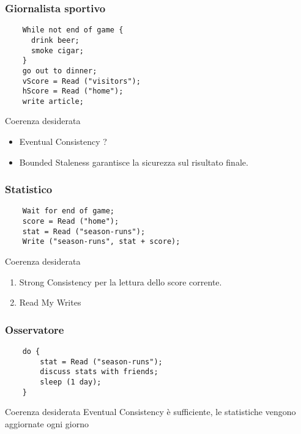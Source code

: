 \begin{frame}[fragile]
 \frametitle{Giornalista sportivo}
  \begin{lstlisting}
    While not end of game {
      drink beer;
      smoke cigar;
    }
    go out to dinner;
    vScore = Read ("visitors");
    hScore = Read ("home");
    write article;
  \end{lstlisting}
  \pause
  \begin{block}{Coerenza desiderata}
   \begin{itemize}
    \item \alert{Eventual Consistency} ?%
    \pause
    \item \alert{Bounded Staleness} garantisce la sicurezza sul risultato finale.
   \end{itemize}  
  \end{block}
\end{frame}

\begin{frame}[fragile]
 \frametitle{Statistico}
  \begin{lstlisting}
    Wait for end of game;
    score = Read ("home");
    stat = Read ("season-runs");
    Write ("season-runs", stat + score);
  \end{lstlisting}
  \pause
  \begin{block}{Coerenza desiderata}
     \begin{enumerate}
       \item \alert{Strong Consistency} per la lettura dello score corrente.
       \pause
       \item \alert{Read My Writes}
     \end{enumerate}
   \end{block}
\end{frame}

\begin{frame}[fragile]
 \frametitle{Osservatore}
  \begin{lstlisting}
    do {
        stat = Read ("season-runs");
        discuss stats with friends;
        sleep (1 day);
    }
  \end{lstlisting}
  \pause
  \begin{block}{Coerenza desiderata}
    \alert{Eventual Consistency} è sufficiente, le statistiche vengono aggiornate ogni giorno
  \end{block}
\end{frame}